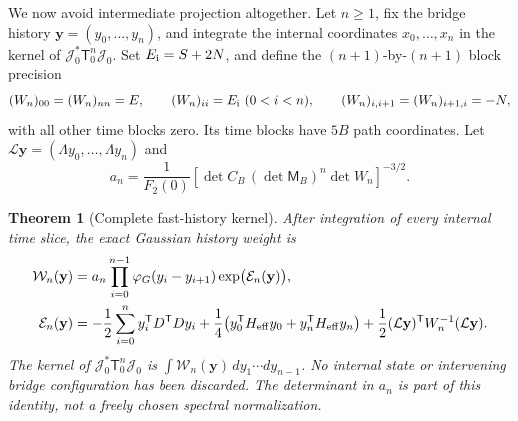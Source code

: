 \documentclass[11pt,oneside]{article}
\newtheorem{theorem}{Theorem}[section]
\begin{document}
We now avoid intermediate projection altogether. Let \(n\ge1\),
fix the bridge history \(\mathbf y=(y_0,\ldots,y_n)\), and
integrate the internal coordinates \(x_0,\ldots,x_n\) in the
kernel of \(\mathcal J_0^*\mathsf T_0^n\mathcal J_0\).
Set \(E_{\rm i}=S+2N\), and define the \((n+1)\)-by-\((n+1)\)
block precision
\begin{equation}
 (W_n)_{00}=(W_n)_{nn}=E,\qquad
 (W_n)_{ii}=E_{\rm i}\ (0<i<n),\qquad
 (W_n)_{i,i+1}=(W_n)_{i+1,i}=-N,
 \label{f16v3:history-precision}
\end{equation}
with all other time blocks zero.
Its time blocks have \(5B\) path coordinates.
Let \(\mathcal L\mathbf y=(\Lambda y_0,\ldots,\Lambda y_n)\) and
\[
 a_n=\frac1{F_2(0)}
       \left[\det C_B\,(\det\mathsf M_B)^n\det W_n\right]^{-3/2}.
\]

\begin{theorem}[Complete fast-history kernel]
\label{f16v3:history}
After integration of every internal time slice, the exact
Gaussian history weight is
\begin{align}
 \mathcal W_n(\mathbf y)
 &=a_n\prod_{i=0}^{n-1}\varphi_G(y_i-y_{i+1})
       \exp\bigl(\mathcal E_n(\mathbf y)\bigr),\notag\\
 \mathcal E_n(\mathbf y)
 &=-\frac12\sum_{i=0}^n y_i^{\mathsf T}D^{\mathsf T}Dy_i
   +\frac14\bigl(y_0^{\mathsf T}H_{\rm eff}y_0
                         +y_n^{\mathsf T}H_{\rm eff}y_n\bigr)
   +\frac12(\mathcal L\mathbf y)^{\mathsf T}
                           W_n^{-1}(\mathcal L\mathbf y).
 \label{f16v3:history-weight}
\end{align}
The kernel of \(\mathcal J_0^*\mathsf T_0^n\mathcal J_0\) is
\(\int\mathcal W_n(\mathbf y)\,dy_1\cdots dy_{n-1}\).
No internal state or intervening bridge configuration has
been discarded. The determinant in \(a_n\) is part of this
identity, not a freely chosen spectral normalization.
\end{theorem}
\end{document}
